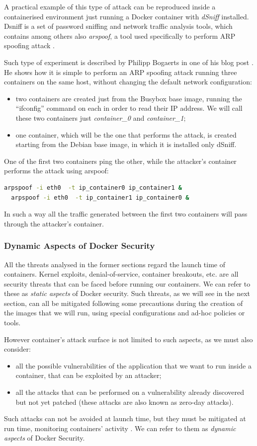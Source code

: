\documentclass[a4paper,12pt]{article}
\begin{document}
A practical example of this type of attack can be reproduced inside a
containerised environment just running a Docker container with \textit{dSniff}
installed. Dsniff is a set of password sniffing and network traffic analysis
tools, which contains among others also \textit{arspoof}, a tool used
specifically to perform ARP spoofing attack \cite{wiki_dsniff}. \par Such type of
experiment is described by Philipp Bogaerts in one of his blog post
 \cite{bogaerts_arpspoof}. He shows how it is simple to perform an ARP spoofing
attack running three containers on the same host, without changing the default
network configuration:
\begin{itemize}
  \item two containers are created just from the Busybox base image, running the
  ``ifconfig'' command on each in order to read their IP address. We will call
  these two containers just \textit{container\_0} and \textit{container\_1};
  \item one container, which will be the one that performs the attack, is created
  starting from the Debian base image, in which it is installed only dSniff.
\end{itemize}
One of the first two containers ping the other, while the attacker's container
performs the attack using arspoof:
\begin{lstlisting}[language=bash,breaklines]
  arpspoof -i eth0  -t ip_container0 ip_container1 &
  arpspoof -i eth0  -t ip_container1 ip_container0 &
\end{lstlisting}
In such a way all the traffic generated between the first two containers will
pass through the attacker's container.

\subsubsection{Dynamic Aspects of Docker Security}

All the threats analysed in the former sections regard the launch time of
containers. Kernel exploits, denial-of-service, container breakouts, etc. are
all security threats that can be faced before running our containers. We can
refer to these as \textit{static aspects} of Docker security. Such threats, as
we will see in the next section, can all be mitigated following some precautions
during the creation of the images that we will run, using special configurations
and ad-hoc policies or tools.\par However container's attack surface is not
limited to such aspects, as we must also consider:
\begin{itemize}
  \item all the possible vulnerabilities of the application that we want to run
  inside a container, that can be exploited by an attacker;
  \item all the attacks that can be performed on a vulnerability already
  discovered but not yet patched (these attacks are also known as zero-day
  attacks).
\end{itemize}
Such attacks can not be avoided at launch time, but they must be mitigated at
run time, monitoring containers' activity . We can refer to them as
\textit{dynamic aspects} of Docker Security. 
\end{document}
